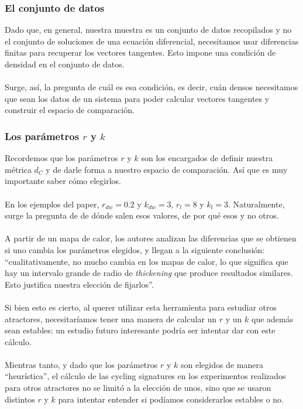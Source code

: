 \documentclass[12pt,a4paper]{article}
\begin{document}
\subsubsection{El conjunto de datos}
Dado que, en general, nuestra muestra es un conjunto de datos recopilados y no el conjunto de soluciones de una ecuación diferencial, necesitamos usar diferencias finitas para recuperar los vectores tangentes. Esto impone una condición de densidad en el conjunto de datos.
\\
\\
Surge, así, la pregunta de cuál es esa condición, es decir, cuán densos necesitamos que sean los datos de un sistema para poder calcular vectores tangentes y construir el espacio de comparación.
\\
\subsubsection{Los parámetros $r$ y $k$}
Recordemos que los parámetros $r$ y $k$ son los encargados de definir nuestra métrica $d_C$ y de darle forma a nuestro espacio de comparación. Así que es muy importante saber cómo elegirlos.
\\
\\
En los ejemplos del paper, $r_{dw} = 0.2$ y $k_{dw} = 3$, $r_l = 8$ y $k_l = 3$. Naturalmente, surge la pregunta de de dónde salen esos valores, de por qué esos y no otros. 
\\
\\
A partir de un mapa de calor, los autores analizan las diferencias que se obtienen si uno cambia los parámetros elegidos, y llegan a la siguiente conclusión: ``cualitativamente, no mucho cambia en los mapas de calor, lo que significa que hay un intervalo grande de radio de \textit{thickening} que produce resultados similares. Esto justifica nuestra elección de fijarlos''.
\\
\\
Si bien esto es cierto, al querer utilizar esta herramienta para estudiar otros atractores, necesitaríamos tener una manera de calcular un $r$ y un $k$ que además sean estables: un estudio futuro interesante podría ser intentar dar con este cálculo.
\\
\\
Mientras tanto, y dado que los parámetros $r$ y $k$ son elegidos de manera ``heurística'', el cálculo de las cycling signatures en los experimentos realizados para otros atractores no se limitó a la elección de unos, sino que se usaron distintos $r$ y $k$ para intentar entender si podíamos considerarlos estables o no.
\\
\\
\\
\end{document}
